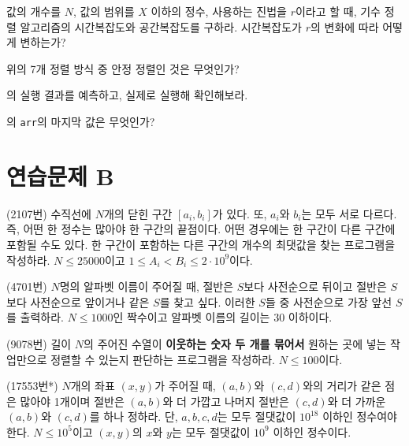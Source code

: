 \begin{problem} \label{pb: radix-time}
    값의 개수를 $N$, 값의 범위를 $X$ 이하의 정수, 사용하는 진법을 $r$이라고 할 때, 기수 정렬 알고리즘의 시간복잡도와 공간복잡도를 구하라. 시간복잡도가 $r$의 변화에 따라 어떻게 변하는가?
\end{problem}
\begin{problem}
    위의 7개 정렬 방식 중 안정 정렬인 것은 무엇인가?
\end{problem}
\begin{problem}
    의 실행 결과를 예측하고, 실제로 실행해 확인해보라.
\end{problem}
\begin{problem}
    의 \texttt{arr}의 마지막 값은 무엇인가?
\end{problem}

\section{연습문제 B}

\begin{problem}
    (2107번) 수직선에 $N$개의 닫힌 구간 $[a_i, b_i]$가 있다. 또, $a_i$와 $b_i$는 모두 서로 다르다. 즉, 어떤 한 정수는 많아야 한 구간의 끝점이다. 어떤 경우에는 한 구간이 다른 구간에 포함될 수도 있다. 한 구간이 포함하는 다른 구간의 개수의 최댓값을 찾는 프로그램을 작성하라. $N \leq 25000$이고 $1 \leq A_i < B_i \leq 2 \cdot 10^9$이다.
\end{problem}

\begin{problem}
    (4701번) $N$명의 알파벳 이름이 주어질 때, 절반은 $S$보다 사전순으로 뒤이고 절반은 $S$보다 사전순으로 앞이거나 같은 $S$를 찾고 싶다. 이러한 $S$들 중 사전순으로 가장 앞선 $S$를 출력하라. $N \leq 1000$인 짝수이고 알파벳 이름의 길이는 $30$ 이하이다.
\end{problem}

\begin{problem}
    (9078번) 길이 $N$의 주어진 수열이 \textbf{이웃하는 숫자 두 개를 묶어서} 원하는 곳에 넣는 작업만으로 정렬할 수 있는지 판단하는 프로그램을 작성하라. $N \leq 100$이다.
\end{problem}

\begin{problem}
    (17553번*) $N$개의 좌표 $(x, y)$가 주어질 때, $(a, b)$와 $(c, d)$와의 거리가 같은 점은 많아야 1개이며 절반은 $(a, b)$와 더 가깝고 나머지 절반은 $(c, d)$와 더 가까운 $(a, b)$와 $(c, d)$를 하나 정하라. 단, $a, b, c, d$는 모두 절댓값이 $10^{18}$ 이하인 정수여야 한다. $N \leq 10^5$이고 $(x, y)$의 $x$와 $y$는 모두 절댓값이 $10^9$ 이하인 정수이다.
\end{problem}

